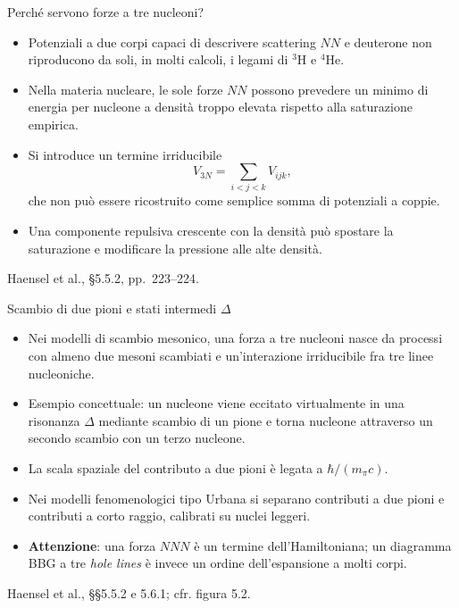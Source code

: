 \begin{frame}[t]{Perché servono forze a tre nucleoni?}
\small
\begin{itemize}
\item Potenziali a due corpi capaci di descrivere scattering $NN$ e deuterone non riproducono da soli, in molti calcoli, i legami di $^3$H e $^4$He.
\item Nella materia nucleare, le sole forze $NN$ possono prevedere un minimo di energia per nucleone a densità troppo elevata rispetto alla saturazione empirica.
\item Si introduce un termine irriducibile
\[
V_{3N}=\sum_{i<j<k}V_{ijk},
\]
che non può essere ricostruito come semplice somma di potenziali a coppie.
\item Una componente repulsiva crescente con la densità può spostare la saturazione e modificare la pressione alle alte densità.
\end{itemize}
{\footnotesize Haensel et al., §5.5.2, pp.~223--224.}
\end{frame}

\begin{frame}[t]{Scambio di due pioni e stati intermedi $\Delta$}
\small
\begin{itemize}
\item Nei modelli di scambio mesonico, una forza a tre nucleoni nasce da processi con almeno due mesoni scambiati e un'interazione irriducibile fra tre linee nucleoniche.
\item Esempio concettuale: un nucleone viene eccitato virtualmente in una risonanza $\Delta$ mediante scambio di un pione e torna nucleone attraverso un secondo scambio con un terzo nucleone.
\item La scala spaziale del contributo a due pioni è legata a $\hbar/(m_\pi c)$.
\item Nei modelli fenomenologici tipo Urbana si separano contributi a due pioni e contributi a corto raggio, calibrati su nuclei leggeri.
\item \textbf{Attenzione}: una forza $NNN$ è un termine dell'Hamiltoniana; un diagramma BBG a tre \emph{hole lines} è invece un ordine dell'espansione a molti corpi.
\end{itemize}
{\footnotesize Haensel et al., §§5.5.2 e 5.6.1; cfr. figura 5.2.}
\end{frame}

